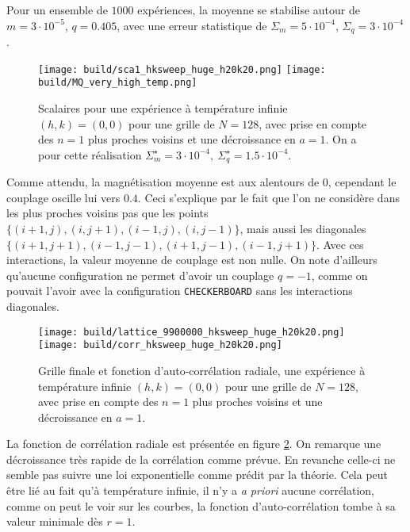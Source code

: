\documentclass[a4paper, 11pt]{article}
\begin{document}
Pour un ensemble de $1000$ expériences, la moyenne se stabilise autour de $m=3\cdot10^{-5}$, $q=0.405$,
avec une erreur statistique de $\Sigma_m = 5\cdot10^{-4}$, $\Sigma_q = 3\cdot10^{-4}$.

\begin{figure}
    \centering
    \texttt{[image: build/sca1\_hksweep\_huge\_h20k20.png]}
    \texttt{[image: build/MQ\_very\_high\_temp.png]}
    \caption{Scalaires pour une expérience à température infinie $(h, k) = (0, 0)$ pour une grille de
    $N=128$, avec prise en compte des $n=1$ plus proches voisins et une décroissance en $a=1$. On a
    pour cette réalisation $\Sigma_m^\star = 3\cdot10^{-4},~ \Sigma_q^\star = 1.5\cdot10^{-4}$.}
    \label{fig:inf_en_sca}
\end{figure}

Comme attendu, la magnétisation moyenne est aux alentours de $0$, cependant le couplage oscille lui
vers $0.4$. Ceci s'explique par le fait que l'on ne considère dans les plus proches voisins pas que
les points $\{(i+1, j), (i, j+1), (i-1, j), (i, j-1)\}$, mais aussi les diagonales $\{(i+1, j+1),
(i-1, j-1), (i+1, j-1), (i-1, j+1)\}$. Avec ces interactions, la valeur moyenne de couplage est non
nulle. On note d'ailleurs qu'aucune configuration ne permet d'avoir un couplage $q=-1$, comme on
pouvait l'avoir avec la configuration \texttt{CHECKERBOARD} sans les interactions diagonales. 

\begin{figure}
    \centering
    \texttt{[image: build/lattice\_9900000\_hksweep\_huge\_h20k20.png]}
    \texttt{[image: build/corr\_hksweep\_huge\_h20k20.png]}
    \caption{Grille finale et fonction d'auto-corrélation radiale, une expérience à température
    infinie $(h, k) = (0, 0)$ pour une grille de $N=128$, avec prise en compte des $n=1$ plus
    proches voisins et une décroissance en $a=1$. } 
    \label{fig:inf_en_corr}
\end{figure}

La fonction de corrélation radiale est présentée en figure \ref{fig:inf_en_corr}. On remarque une
décroissance très rapide de la corrélation comme prévue. En revanche celle-ci ne semble pas suivre
une loi exponentielle comme prédit par la théorie. Cela peut être lié au fait qu'à température
infinie, il n'y a \emph{a priori} aucune corrélation, comme on peut le voir sur les courbes, la
fonction d'auto-corrélation tombe à sa valeur minimale dès $r=1$.
\end{document}
